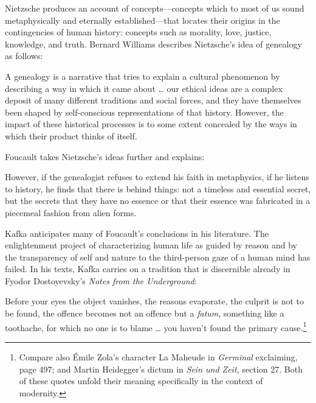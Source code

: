 \documentclass[11pt]{article}
\begin{document}
Nietzsche produces an account of concepts---concepts which to most of
us sound metaphysically and eternally established---that locates their
origins in the contingencies of human history: concepts such as
morality, love, justice, knowledge, and truth. Bernard Williams
describes Nietzsche's idea of genealogy as follows:

\begin{quotex}
  A genealogy is a narrative that tries to explain a cultural
  phenomenon by describing a way in which it came about {\ldots} our
  ethical ideas are a complex deposit of many different traditions and
  social forces, and they have themselves been shaped by
  self-conscious representations of that history. However, the impact
  of these historical processes is to some extent concealed by the
  ways in which their product thinks of itself.
\end{quotex}

Foucault takes Nietzsche's ideas further and explains:

\begin{quotex}
  However, if the genealogist refuses to extend his faith in
  metaphysics, if he listens to history, he finds that there is
   behind things: not a timeless
  and essential secret, but the secrets that they have no essence or
  that their essence was fabricated in a piecemeal fashion from alien
  forms. 
\end{quotex}

Kafka anticipates many of Foucault's conclusions in his
literature. The enlightenment project of characterizing human life
as guided by reason and by the transparency of self and nature to
the third-person gaze of a human mind has failed. In his texts,
Kafka carries on a tradition that is discernible already in Fyodor
Dostoyevsky's \emph{Notes from the Underground}:

\begin{quotex}
  Before your eyes the object vanishes, the reasons evaporate, the
  culprit is not to be found, the offence becomes not an offence
  but a \emph{fatum}, something like a toothache, for which no one
  is to blame {\ldots} you haven't found the primary
  cause.\footnote{Compare also {\'E}mile Zola's character La
    Maheude in \emph{Germinal} exclaiming,  page 497; and Martin Heidegger's dictum in
    \emph{Sein und Zeit,}  section 27. Both of these quotes
    unfold their meaning specifically in the context of
    modernity.} 
\end{quotex}
\end{document}
